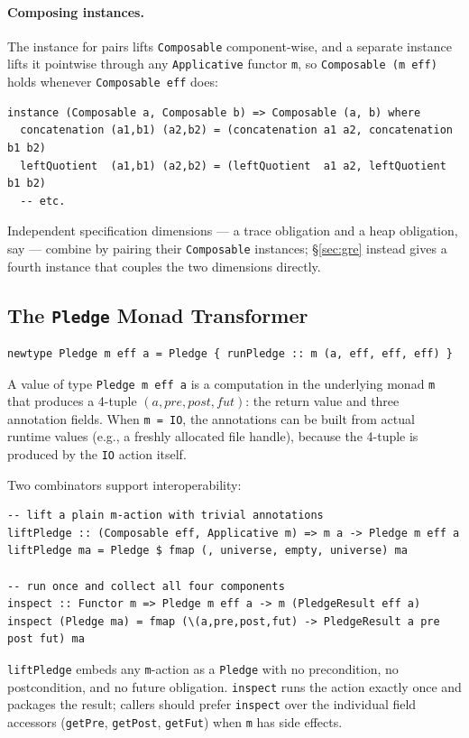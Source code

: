 \documentclass[acmsmall,screen]{acmart}
\newcommand{\pre}{\mathit{pre}}
\newcommand{\post}{\mathit{post}}
\newcommand{\fut}{\mathit{fut}}
\begin{document}
\paragraph{Composing instances.}
The instance for pairs lifts \lstinline{Composable} component-wise, and a
separate instance lifts it pointwise through any \lstinline{Applicative}
functor \lstinline{m}, so \lstinline{Composable (m eff)} holds whenever
\lstinline{Composable eff} does:
\begin{lstlisting}
instance (Composable a, Composable b) => Composable (a, b) where
  concatenation (a1,b1) (a2,b2) = (concatenation a1 a2, concatenation b1 b2)
  leftQuotient  (a1,b1) (a2,b2) = (leftQuotient  a1 a2, leftQuotient  b1 b2)
  -- etc.
\end{lstlisting}
Independent specification dimensions --- a trace obligation and a heap
obligation, say --- combine by pairing their \lstinline{Composable}
instances; \S\ref{sec:gre} instead gives a fourth instance that couples the
two dimensions directly.

\subsection{The \texttt{Pledge} Monad Transformer}
\label{sec:type}

\begin{lstlisting}
newtype Pledge m eff a = Pledge { runPledge :: m (a, eff, eff, eff) }
\end{lstlisting}
A value of type \lstinline{Pledge m eff a} is a computation in the
underlying monad \lstinline{m} that produces a 4-tuple
$(a, \pre, \post, \fut)$: the return value and three annotation fields.
When \lstinline{m = IO}, the annotations can be built from actual runtime
values (e.g., a freshly allocated file handle), because the 4-tuple is
produced by the \lstinline{IO} action itself.

Two combinators support interoperability:
\begin{lstlisting}
-- lift a plain m-action with trivial annotations
liftPledge :: (Composable eff, Applicative m) => m a -> Pledge m eff a
liftPledge ma = Pledge $ fmap (, universe, empty, universe) ma

-- run once and collect all four components
inspect :: Functor m => Pledge m eff a -> m (PledgeResult eff a)
inspect (Pledge ma) = fmap (\(a,pre,post,fut) -> PledgeResult a pre post fut) ma
\end{lstlisting}
\lstinline{liftPledge} embeds any \lstinline{m}-action as a \lstinline{Pledge}
with no precondition, no postcondition, and no future obligation.
\lstinline{inspect} runs the action exactly once and packages the result;
callers should prefer \lstinline{inspect} over the individual field accessors
(\lstinline{getPre}, \lstinline{getPost}, \lstinline{getFut}) when
\lstinline{m} has side effects.
\end{document}

